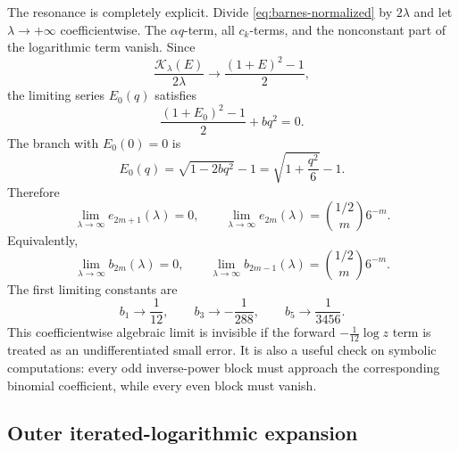 \documentclass[11pt,oneside]{article}
\theoremstyle{plain}
\theoremstyle{definition}
\theoremstyle{remark}
\newcommand{\Kcal}{\mathcal{K}}
\begin{document}
The resonance is completely explicit.  Divide
\cref{eq:barnes-normalized} by \(2\lambda\) and let
\(\lambda\to+\infty\) coefficientwise.  The \(\alpha q\)-term, all
\(c_k\)-terms, and the nonconstant part of the logarithmic term vanish.  Since
\[
 \frac{\Kcal_\lambda(E)}{2\lambda}
 \longrightarrow\frac{(1+E)^2-1}{2},
\]
the limiting series \(E_0(q)\) satisfies
\begin{equation}
 \frac{(1+E_0)^2-1}{2}+bq^2=0.
 \label{eq:barnes-limit-equation}
\end{equation}
The branch with \(E_0(0)=0\) is
\begin{equation}
 E_0(q)=\sqrt{1-2bq^2}-1
 =\sqrt{1+\frac{q^2}{6}}-1.
 \label{eq:barnes-limit-series}
\end{equation}
Therefore
\begin{equation}
 \lim_{\lambda\to\infty}e_{2m+1}(\lambda)=0,
 \qquad
 \lim_{\lambda\to\infty}e_{2m}(\lambda)
 =\binom{1/2}{m}6^{-m}.
 \label{eq:barnes-e-limits}
\end{equation}
Equivalently,
\begin{equation}
 \lim_{\lambda\to\infty}b_{2m}(\lambda)=0,
 \qquad
 \lim_{\lambda\to\infty}b_{2m-1}(\lambda)
 =\binom{1/2}{m}6^{-m}.
 \label{eq:barnes-b-limits}
\end{equation}
The first limiting constants are
\begin{equation}
 b_1\to\frac1{12},
 \qquad
 b_3\to-\frac1{288},
 \qquad
 b_5\to\frac1{3456}.
 \label{eq:barnes-limits-first}
\end{equation}
This coefficientwise algebraic limit is invisible if the forward
\(-\tfrac1{12}\log z\) term is treated as an undifferentiated small error.
It is also a useful check on symbolic computations: every odd inverse-power
block must approach the corresponding binomial coefficient, while every even
block must vanish.

\subsection{Outer iterated-logarithmic expansion}
\label{sec:barnes-outer}
\end{document}
